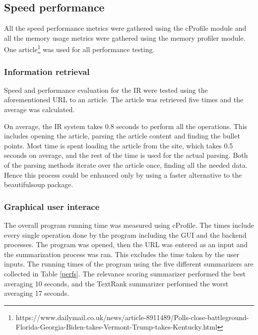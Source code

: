 \documentclass[conference]{IEEEtran}
\begin{document}
\subsection{Speed performance}


All the speed performance metrics were gathered using the cProfile module and all the memory usage metrics were gathered using the  memory profiler module. One article\footnote{https://www.dailymail.co.uk/news/article-8911489/Polls-close-battleground-Florida-Georgia-Biden-takes-Vermont-Trump-takes-Kentucky.html} was used for all performance testing.

\subsubsection{Information retrieval}
Speed and performance evaluation for the IR were tested using the aforementioned URL to an article. The article was retrieved five times and the average was calculated.

On average, the IR system takes 0.8 seconds to perform all the operations. This includes opening the article, parsing the article content and finding the bullet points. Most time is spent loading the article from the site, which takes 0.5 seconds on average, and the rest of the time is used for the actual parsing. Both of the parsing methods iterate over the article once, finding all the needed data. Hence this process could be enhanced only by using a faster alternative to the beautifulsoup package.

\subsubsection{Graphical user interace}
The overall program running time was measured using cProfile. The times include every single operation done by the program including the GUI and the backend processes. The program was opened, then the URL was entered as an input and the summarization process was ran. This excludes the time taken by the user inputs. The running times of the program using the five different summarizers are collected in Table \ref{perfs}. The relevance scoring summarizer performed the best averaging 10 seconds, and the TextRank summarizer performed the worst averaging 17 seconds. 
\end{document}
